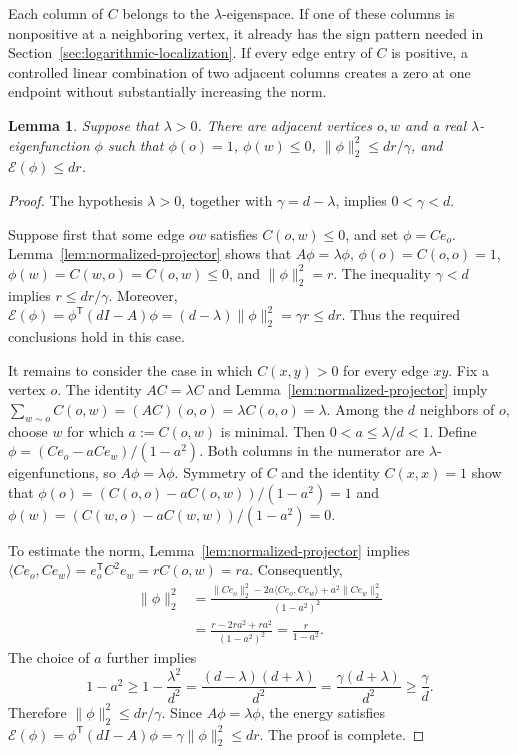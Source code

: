 \documentclass[11pt]{article}
\newtheorem{lemma}[theorem]{Lemma}
\theoremstyle{definition}
\theoremstyle{remark}
\begin{document}
Each column of $C$ belongs to the $\lambda$-eigenspace. If one of these columns is nonpositive at a neighboring vertex, it already has the sign pattern needed in Section~\ref{sec:logarithmic-localization}. If every edge entry of $C$ is positive, a controlled linear combination of two adjacent columns creates a zero at one endpoint without substantially increasing the norm.

\begin{lemma}\label{lem:interpolated-eigenfunction}
Suppose that $\lambda>0$. There are adjacent vertices $o,w$ and a real $\lambda$-eigenfunction $\phi$ such that $\phi(o)=1$, $\phi(w)\leq0$, $\|\phi\|_2^2\leq dr/\gamma$, and $\mathcal E(\phi)\leq dr$.
\end{lemma}

\begin{proof}
The hypothesis $\lambda>0$, together with $\gamma=d-\lambda$, implies $0<\gamma<d$.

Suppose first that some edge $ow$ satisfies $C(o,w)\leq0$, and set $\phi=Ce_o$. Lemma~\ref{lem:normalized-projector} shows that $A\phi=\lambda\phi$, $\phi(o)=C(o,o)=1$, $\phi(w)=C(w,o)=C(o,w)\leq0$, and $\|\phi\|_2^2=r$. The inequality $\gamma<d$ implies $r\leq dr/\gamma$. Moreover, $\mathcal E(\phi)=\phi^{\mathsf T}(dI-A)\phi=(d-\lambda)\|\phi\|_2^2=\gamma r\leq dr$. Thus the required conclusions hold in this case.

It remains to consider the case in which $C(x,y)>0$ for every edge $xy$. Fix a vertex $o$. The identity $AC=\lambda C$ and Lemma~\ref{lem:normalized-projector} imply $\sum_{w\sim o}C(o,w)=(AC)(o,o)=\lambda C(o,o)=\lambda$. Among the $d$ neighbors of $o$, choose $w$ for which $a:=C(o,w)$ is minimal. Then $0<a\leq\lambda/d<1$. Define $\phi=(Ce_o-aCe_w)/(1-a^2)$. Both columns in the numerator are $\lambda$-eigenfunctions, so $A\phi=\lambda\phi$. Symmetry of $C$ and the identity $C(x,x)=1$ show that $\phi(o)=(C(o,o)-aC(o,w))/(1-a^2)=1$ and $\phi(w)=(C(w,o)-aC(w,w))/(1-a^2)=0$.

To estimate the norm, Lemma~\ref{lem:normalized-projector} implies $\langle Ce_o,Ce_w\rangle=e_o^{\mathsf T}C^2e_w=rC(o,w)=ra$. Consequently,
\[
\begin{aligned}
\|\phi\|_2^2
&=\frac{\|Ce_o\|_2^2-2a\langle Ce_o,Ce_w\rangle+a^2\|Ce_w\|_2^2}{(1-a^2)^2}\\
&=\frac{r-2ra^2+ra^2}{(1-a^2)^2}
=\frac{r}{1-a^2}.
\end{aligned}
\]
The choice of $a$ further implies
\[
1-a^2\geq1-\frac{\lambda^2}{d^2}=\frac{(d-\lambda)(d+\lambda)}{d^2}=\frac{\gamma(d+\lambda)}{d^2}\geq\frac{\gamma}{d}.
\]
Therefore $\|\phi\|_2^2\leq dr/\gamma$. Since $A\phi=\lambda\phi$, the energy satisfies $\mathcal E(\phi)=\phi^{\mathsf T}(dI-A)\phi=\gamma\|\phi\|_2^2\leq dr$. The proof is complete.
\end{proof}
\end{document}
